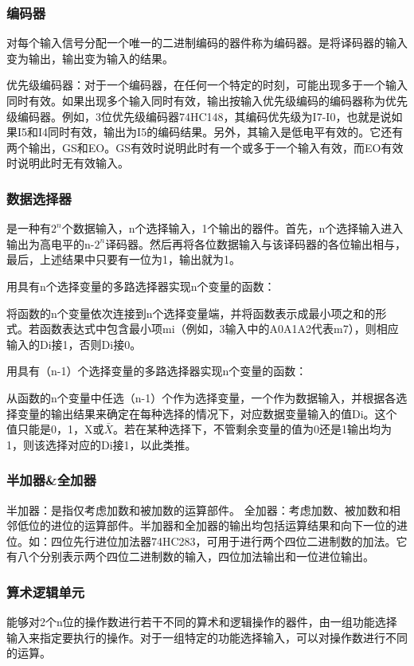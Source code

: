 \documentclass{article}
\begin{document}
	\subsubsection{编码器}
	对每个输入信号分配一个唯一的二进制编码的器件称为编码器。是将译码器的输入变为输出，输出变为输入的结果。\par
	优先级编码器：对于一个编码器，在任何一个特定的时刻，可能出现多于一个输入同时有效。如果出现多个输入同时有效，输出按输入优先级编码的编码器称为优先级编码器。例如，3位优先级编码器74HC148，其编码优先级为I7-I0，也就是说如果I5和I4同时有效，输出为I5的编码结果。另外，其输入是低电平有效的。它还有两个输出，GS和EO。GS有效时说明此时有一个或多于一个输入有效，而EO有效时说明此时无有效输入。
	\subsubsection{数据选择器}
	是一种有$2^n$个数据输入，n个选择输入，1个输出的器件。首先，n个选择输入进入输出为高电平的n-$2^n$译码器。然后再将各位数据输入与该译码器的各位输出相与，最后，上述结果中只要有一位为1，输出就为1。\par
	用具有n个选择变量的多路选择器实现n个变量的函数：\par
	将函数的n个变量依次连接到n个选择变量端，并将函数表示成最小项之和的形式。若函数表达式中包含最小项mi（例如，3输入中的A0A1A2代表m7），则相应输入的Di接1，否则Di接0。\par
	用具有（n-1）个选择变量的多路选择器实现n个变量的函数：\par
	从函数的n个变量中任选（n-1）个作为选择变量，一个作为数据输入，并根据各选择变量的输出结果来确定在每种选择的情况下，对应数据变量输入的值Di。这个值只能是0，1，X或$\bar{X}$。若在某种选择下，不管剩余变量的值为0还是1输出均为1，则该选择对应的Di接1，以此类推。\par
	\subsubsection{半加器\&全加器}
	半加器：是指仅考虑加数和被加数的运算部件。
	全加器：考虑加数、被加数和相邻低位的进位的运算部件。半加器和全加器的输出均包括运算结果和向下一位的进位。如：四位先行进位加法器74HC283，可用于进行两个四位二进制数的加法。它有八个分别表示两个四位二进制数的输入，四位加法输出和一位进位输出。
	
	\subsubsection{算术逻辑单元}
	能够对2个n位的操作数进行若干不同的算术和逻辑操作的器件，由一组功能选择输入来指定要执行的操作。对于一组特定的功能选择输入，可以对操作数进行不同的运算。
\end{document}
